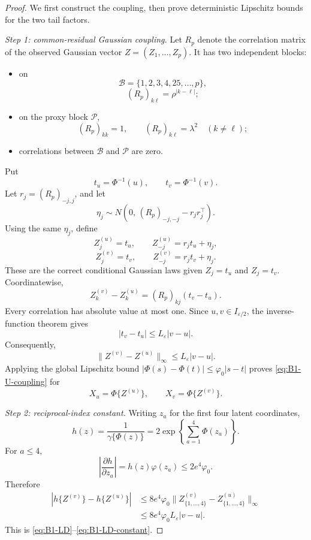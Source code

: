 \begin{proof}
We first construct the coupling, then prove deterministic
Lipschitz bounds for the two tail factors.

\medskip
\noindent
\emph{Step 1: common-residual Gaussian coupling.}
Let \(R_p\) denote the correlation matrix of the observed
Gaussian vector \(Z=(Z_1,\ldots,Z_p)\). It has two independent
blocks:

\begin{itemize}
\item on
\[
 \mathcal B=\{1,2,3,4,25,\ldots,p\},
\]
\[
 (R_p)_{k\ell}=\rho^{|k-\ell|};
\]

\item on the proxy block \(\mathcal P\),
\[
 (R_p)_{kk}=1,
 \qquad
 (R_p)_{k\ell}=\lambda^2
 \quad(k\ne\ell);
\]

\item correlations between \(\mathcal B\) and \(\mathcal P\)
are zero.
\end{itemize}

Put
\[
 t_u=\Phi^{-1}(u),
 \qquad
 t_v=\Phi^{-1}(v).
\]
Let \(r_j=(R_p)_{-j,j}\), and let
\[
 \eta_j\sim
 N\left(
  0,\,
  (R_p)_{-j,-j}-r_jr_j^\top
 \right).
\]
Using the same \(\eta_j\), define
\[
 Z^{(u)}_j=t_u,\qquad
 Z^{(u)}_{-j}=r_jt_u+\eta_j,
\]
\[
 Z^{(v)}_j=t_v,\qquad
 Z^{(v)}_{-j}=r_jt_v+\eta_j.
\]
These are the correct conditional Gaussian laws given
\(Z_j=t_u\) and \(Z_j=t_v\). Coordinatewise,
\begin{equation}
 Z^{(v)}_k-Z^{(u)}_k
 =
 (R_p)_{kj}(t_v-t_u).
 \label{eq:B1-Z-difference}
\end{equation}
Every correlation has absolute value at most one. Since
\(u,v\in I_{\varepsilon/2}\), the inverse-function theorem gives
\begin{equation}
 |t_v-t_u|
 \le L_\varepsilon|v-u|.
 \label{eq:B1-t-difference}
\end{equation}
Consequently,
\[
 \|Z^{(v)}-Z^{(u)}\|_\infty
 \le L_\varepsilon|v-u|.
\]
Applying the global Lipschitz bound
\(|\Phi(s)-\Phi(t)|\le\varphi_0|s-t|\) proves
\eqref{eq:B1-U-coupling} for
\[
 X_u=\Phi\{Z^{(u)}\},
 \qquad
 X_v=\Phi\{Z^{(v)}\}.
\]

\medskip
\noindent
\emph{Step 2: reciprocal-index constant.}
Writing \(z_a\) for the first four latent coordinates,
\[
 h(z)=\frac1{\gamma\{\Phi(z)\}}
 =
 2\exp\left\{\sum_{a=1}^4\Phi(z_a)\right\}.
\]
For \(a\le4\),
\[
 \left|\frac{\partial h}{\partial z_a}\right|
 =
 h(z)\varphi(z_a)
 \le2e^4\varphi_0.
\]
Therefore
\begin{align}
 |h\{Z^{(v)}\}-h\{Z^{(u)}\}|
 &\le
 8e^4\varphi_0
 \|Z_{\{1,\ldots,4\}}^{(v)}
   -Z_{\{1,\ldots,4\}}^{(u)}\|_\infty
 \nonumber\\
 &\le
 8e^4\varphi_0L_\varepsilon|v-u|.
\end{align}
This is \eqref{eq:B1-LD}--\eqref{eq:B1-LD-constant}.


\end{proof}
